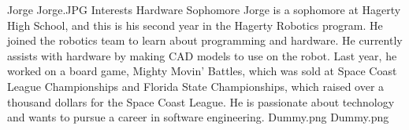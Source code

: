 \insertbio
{Jorge}
{Jorge.JPG}
{Interests}
{Hardware}
{Sophomore}
{
Jorge is a sophomore at Hagerty High School, and this is his second year in the Hagerty Robotics program. He joined the robotics team to learn about programming and hardware. He currently assists with hardware by making CAD models to use on the robot. Last year, he worked on a board game, Mighty Movin’ Battles, which was sold at Space Coast League Championships and Florida State Championships, which raised over a thousand dollars for the Space Coast League. He is passionate about technology and wants to pursue a career in software engineering.
}
{Dummy.png}
{Dummy.png}
